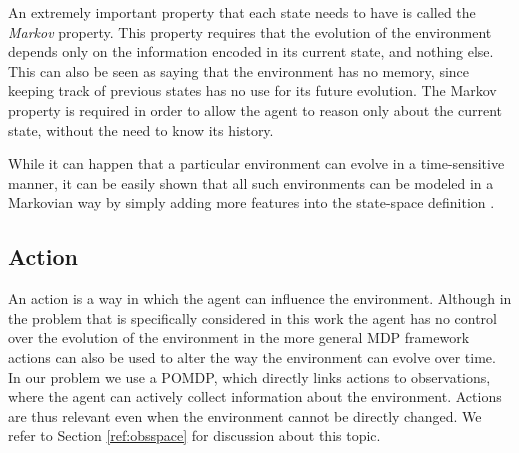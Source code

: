 
An extremely important property that each state needs to have is called the \textit{Markov}
property. This property requires that the evolution of the environment depends only on the
information encoded in its current state, and nothing else. This can also be seen as saying that the
environment has no memory, since keeping track of previous states has no use for its future
evolution. The Markov property is required in order to allow the agent to reason only about the
current state, without the need to know its history.

While it can happen that a particular environment can evolve in a time-sensitive manner, it can be
easily shown that all such environments can be modeled in a Markovian way by simply adding more
features into the state-space definition \cite{cit:boutilier}.

\subsection{Action}

An action is a way in which the agent can influence the environment. Although in the problem that is
specifically considered in this work the agent has no control over the evolution of the environment
in the more general MDP framework actions can also be used to alter the way the environment can
evolve over time. In our problem we use a POMDP, which directly links actions to observations, where
the agent can actively collect information about the environment. Actions are thus relevant even
when the environment cannot be directly changed. We refer to Section \ref{ref:obsspace} for discussion
about this topic.

